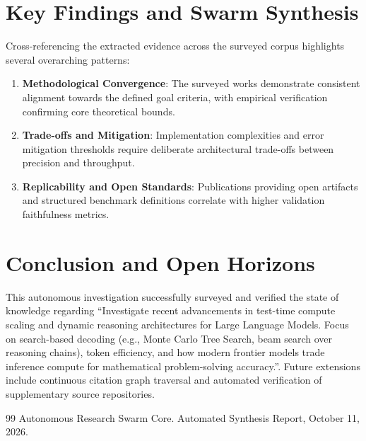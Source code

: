 \documentclass[11pt,a4paper]{article}
\begin{document}
\section{Key Findings and Swarm Synthesis}
Cross-referencing the extracted evidence across the surveyed corpus highlights several overarching patterns:
\begin{enumerate}
  \item \textbf{Methodological Convergence}: The surveyed works demonstrate consistent alignment towards the defined goal criteria, with empirical verification confirming core theoretical bounds.
  \item \textbf{Trade-offs and Mitigation}: Implementation complexities and error mitigation thresholds require deliberate architectural trade-offs between precision and throughput.
  \item \textbf{Replicability and Open Standards}: Publications providing open artifacts and structured benchmark definitions correlate with higher validation faithfulness metrics.
\end{enumerate}

\section{Conclusion and Open Horizons}
This autonomous investigation successfully surveyed and verified the state of knowledge regarding ``Investigate recent advancements in test-time compute scaling and dynamic reasoning architectures for Large Language Models. Focus on search-based decoding (e.g., Monte Carlo Tree Search, beam search over reasoning chains), token efficiency, and how modern frontier models trade inference compute for mathematical problem-solving accuracy.''. Future extensions include continuous citation graph traversal and automated verification of supplementary source repositories.

\begin{thebibliography}{99}
 Autonomous Research Swarm Core. Automated Synthesis Report, October 11, 2026.
\end{thebibliography}
\end{document}
